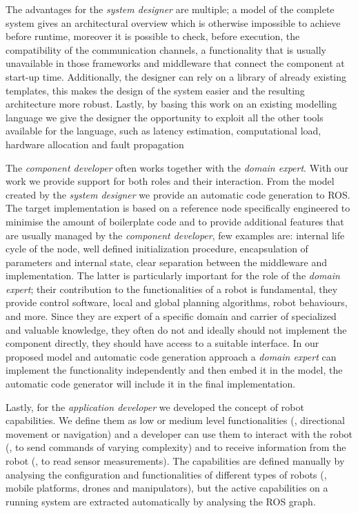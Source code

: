 The advantages for the \textit{system designer} are multiple; a model of the complete system gives an architectural overview which is otherwise impossible to achieve before runtime, moreover it is possible to check, before execution, the compatibility of the communication channels, a functionality that is usually unavailable in those frameworks and middleware that connect the component at start-up time. Additionally, the designer can rely on a library of already existing templates, this makes the design of the system easier and the resulting architecture more robust. Lastly, by basing this work on an existing modelling language we give the designer the opportunity to exploit all the other tools available for the language, such as latency estimation, computational load, hardware allocation and fault propagation

The \textit{component developer} often works together with the \textit{domain expert}. With our work we provide support for both roles and their interaction. From the model created by the \textit{system designer} we provide an automatic code generation to ROS. The target implementation is based on a reference node specifically engineered to minimise the amount of boilerplate code and to provide additional features that are usually managed by the \textit{component developer}, few examples are: internal life cycle of the node, well defined initialization procedure, encapsulation of parameters and internal state, clear separation between the middleware and implementation. The latter is particularly important for the role of the \textit{domain expert}; their contribution to the functionalities of a robot is fundamental, they provide control software, local and global planning algorithms, robot behaviours, and more. Since they are expert of a specific domain and carrier of specialized and valuable knowledge, they often do not and ideally should not implement the component directly, they should have access to a suitable interface. In our proposed model and automatic code generation approach a \textit{domain expert} can implement the functionality independently and then embed it in the model, the automatic code generator will include it in the final implementation.

Lastly, for the \textit{application developer} we developed the concept of robot capabilities. We define them as low or medium level functionalities (\eg, directional movement or navigation) and a developer can use them to interact with the robot (\ie, to send commands of varying complexity) and to receive information from the robot (\ie, to read sensor measurements). The capabilities are defined manually by analysing the configuration and functionalities of different types of robots (\ie, mobile platforms, drones and manipulators), but the active capabilities on a running system are extracted automatically by analysing the ROS graph.

